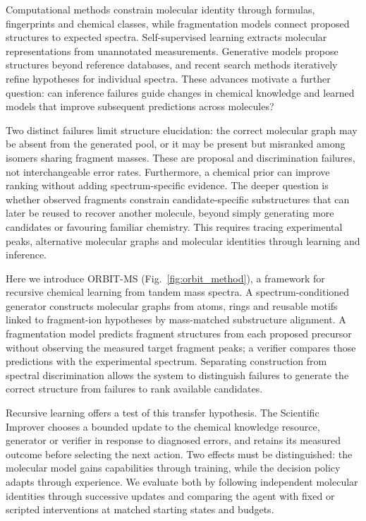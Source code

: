 \documentclass[11pt]{article}
\begin{document}
Computational methods constrain molecular identity through formulas, fingerprints and chemical classes,\cite{Duhrkop2015,Duhrkop2019,Duhrkop2021,Goldman2023} while fragmentation models connect proposed structures to expected spectra.\cite{Wang2021CFMID} Self-supervised learning extracts molecular representations from unannotated measurements.\cite{Bushuiev2026Dreams} Generative models propose structures beyond reference databases, and recent search methods iteratively refine hypotheses for individual spectra.\cite{Stravs2022,Bohde2025,Wang2026MetGenX,Manjrekar2026FOAM,Acikalin2026GEMS} These advances motivate a further question: can inference failures guide changes in chemical knowledge and learned models that improve subsequent predictions across molecules?

Two distinct failures limit structure elucidation: the correct molecular graph may be absent from the generated pool, or it may be present but misranked among isomers sharing fragment masses. These are proposal and discrimination failures, not interchangeable error rates. Furthermore, a chemical prior can improve ranking without adding spectrum-specific evidence. The deeper question is whether observed fragments constrain candidate-specific substructures that can later be reused to recover another molecule, beyond simply generating more candidates or favouring familiar chemistry.\cite{Stravs2022,Schymanski2014} This requires tracing experimental peaks, alternative molecular graphs and molecular identities through learning and inference.

Here we introduce ORBIT-MS (Fig.~\ref{fig:orbit_method}), a framework for recursive chemical learning from tandem mass spectra. A spectrum-conditioned generator constructs molecular graphs from atoms, rings and reusable motifs linked to fragment-ion hypotheses by mass-matched substructure alignment. A fragmentation model predicts fragment structures from each proposed precursor without observing the measured target fragment peaks; a verifier compares those predictions with the experimental spectrum. Separating construction from spectral discrimination allows the system to distinguish failures to generate the correct structure from failures to rank available candidates.

Recursive learning offers a test of this transfer hypothesis. The Scientific Improver chooses a bounded update to the chemical knowledge resource, generator or verifier in response to diagnosed errors, and retains its measured outcome before selecting the next action. Two effects must be distinguished: the molecular model gains capabilities through training, while the decision policy adapts through experience. We evaluate both by following independent molecular identities through successive updates and comparing the agent with fixed or scripted interventions at matched starting states and budgets.
\end{document}
